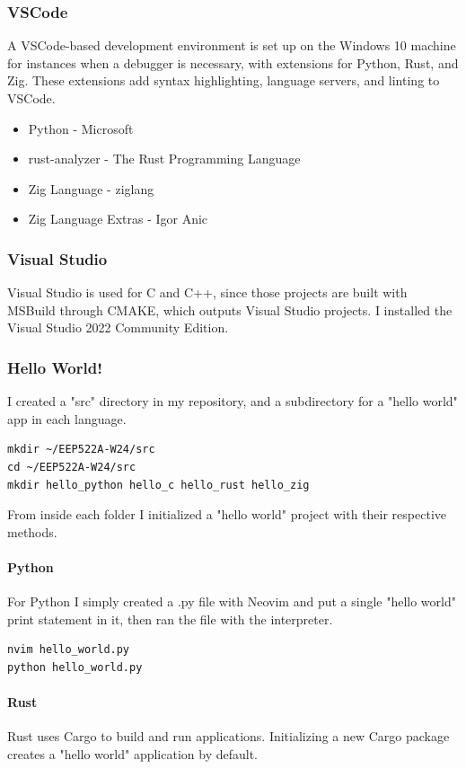 \documentclass[12pt]{article}
\begin{document}
\subsubsection{VSCode} A VSCode-based development environment is set up on the Windows 10 machine for instances when a debugger is necessary, with extensions for Python, Rust, and Zig. These extensions add syntax highlighting, language servers, and linting to VSCode.
\begin{itemize}
\item Python - Microsoft
\item rust-analyzer - The Rust Programming Language
\item Zig Language - ziglang
\item Zig Language Extras - Igor Anic
\end{itemize}

\subsubsection{Visual Studio}
Visual Studio is used for C and C++, since those projects are built with MSBuild through CMAKE, which outputs Visual Studio projects. I installed the Visual Studio 2022 Community Edition.

\subsubsection{Hello World!}
I created a "src" directory in my repository, and a subdirectory for a "hello world" app in each language.

\begin{lstlisting}
mkdir ~/EEP522A-W24/src 
cd ~/EEP522A-W24/src
mkdir hello_python hello_c hello_rust hello_zig
\end{lstlisting}

From inside each folder I initialized a "hello world" project with their respective methods.

\paragraph{Python}
For Python I simply created a .py file with Neovim and put a single "hello world" print statement in it, then ran the file with the interpreter.

\begin{lstlisting}
nvim hello_world.py
python hello_world.py
\end{lstlisting}

\paragraph{Rust}
Rust uses Cargo to build and run applications. Initializing a new Cargo package creates a "hello world" application by default.
\end{document}
